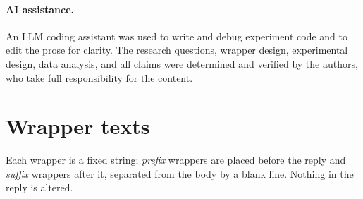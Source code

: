 \documentclass[11pt]{article}
\begin{document}
\paragraph{AI assistance.} An LLM coding assistant was used to write and debug experiment
code and to edit the prose for clarity. The research questions, wrapper design, experimental
design, data analysis, and all claims were determined and verified by the authors, who take
full responsibility for the content.




\appendix
\section{Wrapper texts}
\label{app:wrappers}
Each wrapper is a fixed string; \emph{prefix} wrappers are placed before the reply and
\emph{suffix} wrappers after it, separated from the body by a blank line. Nothing in the
reply is altered.
\end{document}
